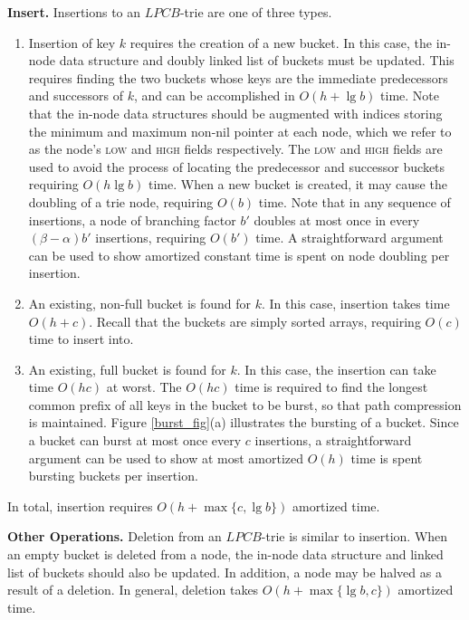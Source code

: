 \documentclass[]{acmtrans2m}
\begin{document}
\textbf{Insert.} Insertions to an $LPCB$-trie are one of three types.
\begin{enumerate}
\item Insertion of key $k$ requires the creation of a new bucket. In this case,
      the in-node data structure and doubly linked list of buckets must be updated. This requires finding the
      two buckets whose keys are the immediate predecessors and successors of $k$, and can be accomplished in  
      $O(h + \lg b)$ time. Note that the in-node data structures should be augmented with indices storing the minimum
      and maximum non-nil pointer at each node, which we refer to as the node's \textsc{low} and \textsc{high}
      fields respectively. The \textsc{low} and \textsc{high} fields are used to avoid the process of locating
      the predecessor and successor buckets requiring $O(h\lg b)$ time. When a new bucket is created, it may
      cause the doubling of a trie node, requiring $O(b)$ time. Note that in any sequence of insertions,
      a node of branching factor $b'$ doubles at most once in every $(\beta - \alpha)b'$ insertions, requiring $O(b')$ time. A
      straightforward argument can be used to show amortized constant time is spent on node doubling per insertion.
\item An existing, non-full bucket is found for $k$. In this case, insertion takes time $O(h + c)$. Recall that the
      buckets are simply sorted arrays, requiring $O(c)$ time to insert into.
\item An existing, full bucket is found for $k$. In this case, the insertion can take time $O(hc)$ at worst. The $O(hc)$ time is required to find
      the longest common prefix of all keys in the bucket to be burst, so that path compression is maintained. Figure \ref{burst_fig}(a)
      illustrates the bursting of a bucket. Since a bucket can burst at most once every $c$ insertions, a straightforward argument
      can be used to show at most amortized $O(h)$ time is spent bursting buckets per insertion.
\end{enumerate}
In total, insertion requires $O(h + \max\lbrace c, \lg b \rbrace)$ amortized time.

\textbf{Other Operations.} Deletion from an $LPCB$-trie is similar to insertion. When
an empty bucket is deleted from a node, the in-node data structure and linked list of buckets
should also be updated. In addition, a node may be halved as a result of a deletion.
In general, deletion takes $O(h + \max\lbrace \lg b, c \rbrace)$ amortized time.
\end{document}
